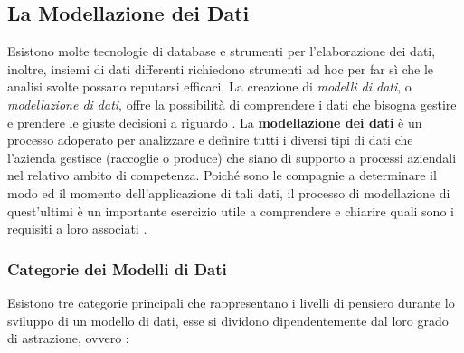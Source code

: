 \subsection{La Modellazione dei Dati}
Esistono molte tecnologie di database e strumenti per l'elaborazione dei dati, inoltre, insiemi di dati differenti richiedono strumenti ad hoc per far sì che le analisi svolte possano reputarsi efficaci. La creazione di \textit{modelli di dati}, o \textit{modellazione di dati}, offre la possibilità di comprendere i dati che bisogna gestire e prendere le giuste decisioni a riguardo \cite{aws_data_modeling}.
La \textbf{modellazione dei dati} è un processo adoperato per analizzare e definire tutti i diversi tipi di dati che l'azienda gestisce (raccoglie o produce) che siano di supporto a processi aziendali nel relativo ambito di competenza. Poiché sono le compagnie a determinare il modo ed il momento dell'applicazione di tali dati, il processo di modellazione di quest'ultimi è un importante esercizio utile a comprendere e chiarire quali sono i requisiti a loro associati \cite{microsoft_data_modeling}.

\subsubsection{Categorie dei Modelli di Dati}

Esistono tre categorie principali che rappresentano i livelli di pensiero durante lo sviluppo di un modello di dati, esse si dividono dipendentemente dal loro grado di astrazione, ovvero \cite{ibm_data_modeling}:

